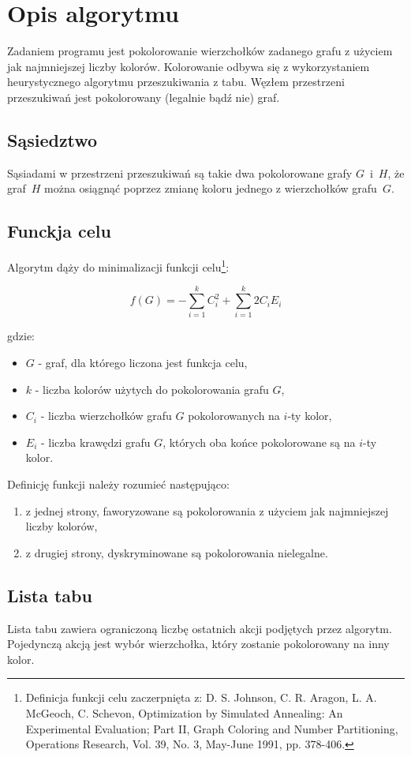 \section{Opis algorytmu}
Zadaniem programu jest pokolorowanie wierzchołków zadanego grafu z użyciem jak najmniejszej liczby kolorów.
Kolorowanie odbywa się z wykorzystaniem heurystycznego algorytmu przeszukiwania z tabu.
Węzłem przestrzeni przeszukiwań jest pokolorowany (legalnie bądź nie) graf.

\subsection{Sąsiedztwo}
Sąsiadami w przestrzeni przeszukiwań są takie dwa pokolorowane grafy $G$~i~$H$, że graf~$H$ można osiągnąć poprzez zmianę koloru jednego z wierzchołków grafu~$G$.

\subsection{Funckja celu}
Algorytm dąży do minimalizacji funkcji celu\footnote{Definicja funkcji celu zaczerpnięta z: D. S. Johnson, C. R. Aragon, L. A. McGeoch, C. Schevon, Optimization by Simulated Annealing: An Experimental Evaluation; Part II, Graph Coloring and Number Partitioning, Operations Research, Vol. 39, No. 3, May-June 1991, pp. 378-406.}:

\begin{equation}
 f(G) = -\sum_{i=1}^{k} C_i^2 + \sum_{i=1}^{k} 2 C_i E_i
\end{equation}

gdzie:
\begin{itemize}
 \item $G$ - graf, dla którego liczona jest funkcja celu,
 \item $k$ - liczba kolorów użytych do pokolorowania grafu $G$,
 \item $C_i$ - liczba wierzchołków grafu $G$ pokolorowanych na $i$-ty kolor,
 \item $E_i$ - liczba krawędzi grafu $G$, których oba końce pokolorowane są na $i$-ty kolor.
\end{itemize}

Definicję funkcji należy rozumieć następująco:

\begin{enumerate}
 \item z jednej strony, faworyzowane są pokolorowania z użyciem jak najmniejszej liczby kolorów,
 \item z drugiej strony, dyskryminowane są pokolorowania nielegalne.
\end{enumerate}

\subsection{Lista tabu}
Lista tabu zawiera ograniczoną liczbę ostatnich akcji podjętych przez algorytm.
Pojedynczą akcją jest wybór wierzchołka, który zostanie pokolorowany na inny kolor.
